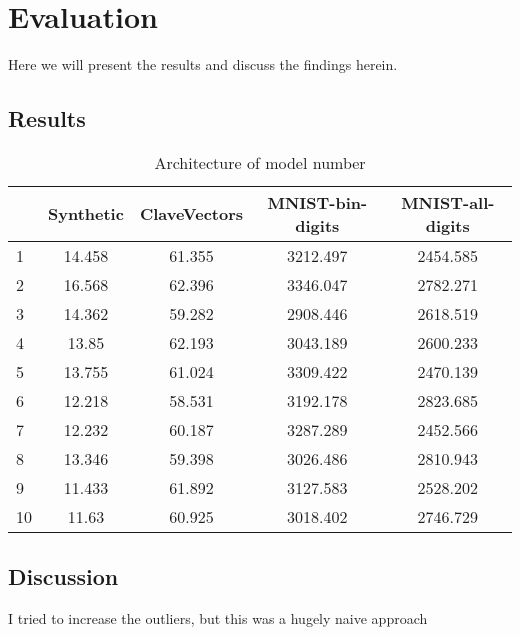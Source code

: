\chapter{Evaluation}
Here we will present the results and discuss the findings herein.

\section{Results}

\begin{table}[H]
	\centering
\begin{tabular}{|lcccc|}
	\hline
	\backslashbox{run \#}{Dataset}
&{Synthetic}&{ClaveVectors}&{MNIST-bin-digits}&{MNIST-all-digits} \\\hline\hline
	1 & 14.458 & 61.355 & 3212.497 & 2454.585 \\ \hline
	2 & 16.568 & 62.396 & 3346.047 & 2782.271 \\ \hline
	3 & 14.362 & 59.282 & 2908.446 & 2618.519 \\ \hline
	4 & 13.85 & 62.193 & 3043.189 &  2600.233 \\ \hline
	5 & 13.755 & 61.024 & 3309.422 & 2470.139 \\ \hline
	6 & 12.218 & 58.531 & 3192.178 & 2823.685 \\ \hline
	7 & 12.232 & 60.187 & 3287.289 & 2452.566 \\ \hline
	8 & 13.346 & 59.398 & 3026.486 & 2810.943 \\ \hline
	9 & 11.433 & 61.892 & 3127.583 & 2528.202 \\ \hline
	10 & 11.63 & 60.925 & 3018.402 & 2746.729 \\ \hline
\end{tabular}
	\caption{Architecture of model number}
\end{table}


\section{Discussion}
I tried to increase the outliers, but this was a hugely naive approach


